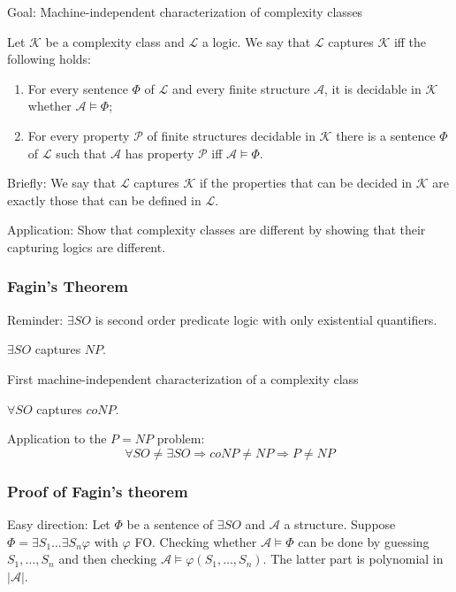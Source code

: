 \documentclass{beamer}
\renewcommand{\L}{\mathcal{L}}
\newcommand{\K}{\mathcal{K}}
\newcommand{\A}{\mathcal{A}}
\renewcommand{\P}{\mathcal{P}}
\begin{document}
\begin{frame}
	\titlepage
\end{frame}


\begin{frame}
	
	Goal: Machine-independent characterization of complexity classes
	\begin{definition}
		Let $\mathcal{K}$ be a complexity class and $\mathcal{L}$ a logic. We say that $\L$ captures $\K$ iff the following holds:
		\begin{enumerate}
			\item For every sentence $Φ$ of $\L$ and every finite structure $\A$, it is decidable in $\K$ whether $\A \vDash Φ$;
			\item For every property $\P$ of finite structures decidable in $\K$ there is a sentence $Φ$ of $\L$ such that $\A$ has property $\P$ iff $\A \vDash Φ$.
		\end{enumerate}
	\end{definition}
	\medskip
	Briefly: We say that $\L$ captures $\K$ if the properties that can be decided in $\K$ are exactly those that can be defined in $\L$.
	
	\medskip
	
	Application: Show that complexity classes are different by showing that their capturing logics are different.
\end{frame}

\begin{frame}
\frametitle{Fagin's Theorem}
Reminder: $\exists SO$ is second order predicate logic with only existential quantifiers.
  \begin{theorem}[Fagin]
    $∃SO$ captures $NP$.
  \end{theorem}
  First machine-independent characterization of a complexity class   
\end{frame}
\begin{frame}
 \begin{corollary}
  $\forall SO$ captures $coNP$.
 \end{corollary}
  Application to the $P = NP$ problem:
  \begin{equation*}
   \forall SO \neq \exists SO \Rightarrow coNP \neq NP \Rightarrow P \neq NP
  \end{equation*}

\end{frame}

\begin{frame}
 \frametitle{Proof of Fagin's theorem}
 Easy direction: Let $Φ$ be a sentence of $\exists SO$ and $\A$ a structure. Suppose $Φ = \exists S_1 … \exists S_n φ$ with $φ$ FO. Checking whether $\A \vDash Φ$ can be done by guessing $S_1,…,S_n$ and then checking $\A \vDash φ(S_1,…,S_n)$. The latter part is polynomial in $|\A|$.
\end{frame}
\end{document}
